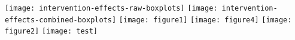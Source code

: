 \documentclass{article}%
\begin{document}
\centering
\texttt{[image: intervention-effects-raw-boxplots]}
\texttt{[image: intervention-effects-combined-boxplots]}
\texttt{[image: figure1]}
\newpage
\texttt{[image: figure4]}
\texttt{[image: figure2]}
\texttt{[image: test]}
\end{document}

